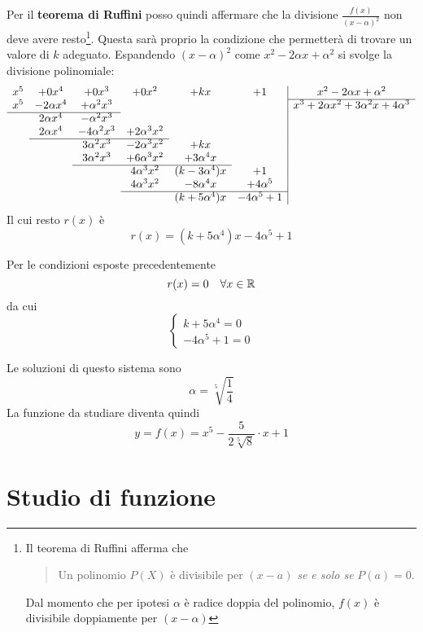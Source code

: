 \documentclass[a4paper, oneside, titlepage, reqno]{book}
\begin{document}
Per il \textbf{teorema di Ruffini}\supercite{blu:1} posso quindi affermare che la divisione $\frac{f(x)}{(x-\alpha)^2}$ non deve avere resto\footnote{Il teorema di Ruffini afferma che
\begin{quotation}
Un polinomio $P(X)$ è divisibile per $(x-a)$ \textit{se e solo se} $P(a)=0$.
\end{quotation}
Dal momento che per ipotesi $\alpha$ è radice doppia del polinomio, $f(x)$ è divisibile doppiamente per $(x-\alpha)$}. Questa sarà proprio la condizione che permetterà di trovare un valore di $k$ adeguato.
Espandendo $(x-\alpha)^2$ come $x^2-2\alpha x+\alpha^2$ si svolge la divisione polinomiale:
\[
\begin{array}{cccccc|c}
x^5 & +0x^4 & +0x^3 & +0x^2 & +kx & +1  & x^2-2\alpha x+\alpha^2\\ \cline{7-7}
x^5 & -2\alpha x^4 & +\alpha^2x^3 & & & & x^3+2\alpha x^2+3\alpha^2x+4\alpha^3\\\cline{1-3}
& 2\alpha x^4 & -\alpha^2x^3 & & & & \\
& 2\alpha x^4 & -4\alpha^2x^3 & +2\alpha^3x^2 & & & \\
\cline{2-4}
& & 3\alpha^2x^3 & -2\alpha^3x^2 &+ kx & & \\
& & 3\alpha^2x^3 & +6\alpha^3x^2 & +3\alpha^4x & & \\
\cline{3-5}
& & & 4\alpha^3x^2 & (k-3\alpha^4)x & + 1& \\
& & & 4\alpha^3x^2 & -8\alpha^4x & +4\alpha^5 & \\
\cline{4-6}
& & & & (k+5\alpha^4)x & -4\alpha^5 + 1& 
\end{array}
\]
Il cui resto $r(x)$ è
\[
r(x)=(k+5\alpha^4)x -4\alpha^5 + 1
\]

Per le condizioni esposte precedentemente
\[
r(x)=0\quad \forall x\in \mathbb{R}
\]
da cui
\[
\begin{cases}
k+5\alpha^4=0\\
-4\alpha^5+1=0
\end{cases}
\]

Le soluzioni di questo sistema sono
\[
\alpha=\sqrt[5]{\frac{1}{4}}
\]
La funzione da studiare diventa quindi
\begin{equation}\label{eq:2}
y=f(x)=x^5-\frac{5}{2\sqrt[5]{8}}\cdot x+1
\end{equation}

\section{Studio di funzione}
\end{document}
